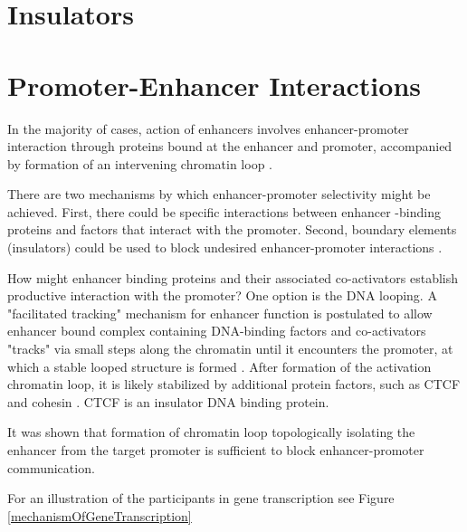 \documentclass[12pt]{paper}
\begin{document}
\section{Insulators}

\section{Promoter-Enhancer Interactions}
In the majority of cases, action of enhancers involves enhancer-promoter interaction through proteins bound at the enhancer and promoter, accompanied by formation of an intervening chromatin loop \cite{Kulaeva12}.

There are two mechanisms by which enhancer-promoter  selectivity might be achieved. First, there could be specific interactions between enhancer -binding proteins and factors that interact with the promoter. Second, boundary elements (insulators) could be used to block undesired enhancer-promoter interactions \cite{Blackwood98}. 

How might enhancer binding proteins and their associated co-activators  establish productive interaction with the promoter? One option is the DNA looping. A "facilitated tracking" mechanism for enhancer function is postulated to allow enhancer bound complex containing DNA-binding factors and co-activators "tracks" via small steps along the chromatin until it encounters the promoter, at which a stable looped structure is formed \cite{Blackwood98}. After formation of the activation chromatin loop, it is likely stabilized by additional protein factors, such as CTCF and cohesin \cite{Kulaeva12}. CTCF is an insulator DNA binding protein. 


It was shown that formation of chromatin loop topologically isolating the enhancer from the target promoter is sufficient to block enhancer-promoter communication. 


For an illustration of the participants in gene transcription see Figure \ref{mechanismOfGeneTranscription}
\end{document}
